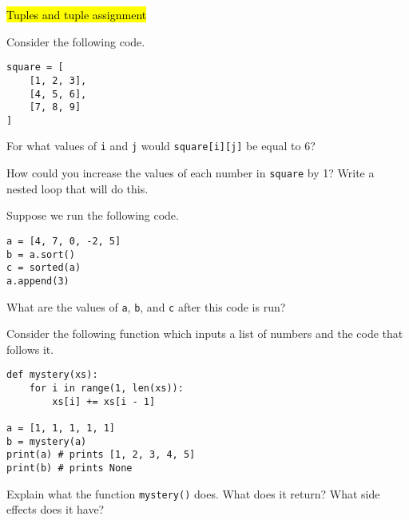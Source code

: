 \documentclass[12pt]{exam}
\begin{document}
\begin{questions}


\question \hl{Tuples and tuple assignment}
\vfill

\newpage
\question Consider the following code.
\begin{lstlisting}
square = [
    [1, 2, 3], 
    [4, 5, 6], 
    [7, 8, 9]
]
\end{lstlisting}
\begin{parts}
\item For what values of \verb|i| and \verb|j| would \verb|square[i][j]| be equal to 6? 
\vfill

\item How could you increase the values of each number in \verb|square| by 1? Write a nested loop that will do this.   
\vfill
\vfill
\end{parts}


\question Suppose we run the following code. 

\begin{verbatim}
a = [4, 7, 0, -2, 5]
b = a.sort()
c = sorted(a)
a.append(3)
\end{verbatim}

What are the values of \verb|a|, \verb|b|, and \verb|c| after this code is run? 
\vfill

\question Consider the following function which inputs a list of numbers and the code that follows it.
\begin{verbatim}
def mystery(xs): 
    for i in range(1, len(xs)):
        xs[i] += xs[i - 1]

a = [1, 1, 1, 1, 1]
b = mystery(a)
print(a) # prints [1, 2, 3, 4, 5]
print(b) # prints None
\end{verbatim}

Explain what the function \lstinline{mystery()} does.  What does it return?  What side effects does it have?  
\vfill
\vfill


\end{questions}
\end{document}
